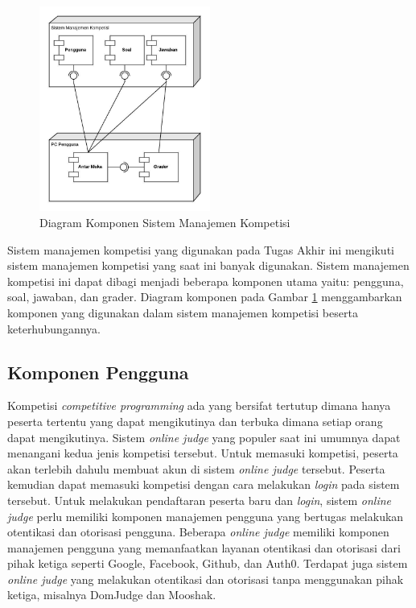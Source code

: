 \begin{figure}[ht!]
    \centering
    \includegraphics[width=0.5\textwidth]{images/oj-components}
    \caption{Diagram Komponen Sistem Manajemen Kompetisi}
    \label{fig:oj-components}
\end{figure}

\par Sistem manajemen kompetisi yang digunakan pada Tugas Akhir ini mengikuti sistem manajemen kompetisi yang saat ini banyak digunakan. Sistem manajemen kompetisi ini dapat dibagi menjadi beberapa komponen utama yaitu: pengguna, soal, jawaban, dan grader. Diagram komponen pada Gambar \ref{fig:oj-components} menggambarkan komponen yang digunakan dalam sistem manajemen kompetisi beserta keterhubungannya.

\subsection{Komponen Pengguna}

\par Kompetisi \textit{competitive programming} ada yang bersifat tertutup dimana hanya peserta tertentu yang dapat mengikutinya dan terbuka dimana setiap orang dapat mengikutinya. Sistem \textit{online judge} yang populer saat ini umumnya dapat menangani kedua jenis kompetisi tersebut. Untuk memasuki kompetisi, peserta akan terlebih dahulu membuat akun di sistem \textit{online judge} tersebut. Peserta kemudian dapat memasuki kompetisi dengan cara melakukan \textit{login} pada sistem tersebut. Untuk melakukan pendaftaran peserta baru dan \textit{login}, sistem \textit{online judge} perlu memiliki komponen manajemen pengguna yang bertugas melakukan otentikasi dan otorisasi pengguna. Beberapa \textit{online judge} memiliki komponen manajemen pengguna yang memanfaatkan layanan otentikasi dan otorisasi dari pihak ketiga seperti Google, Facebook, Github, dan Auth0. Terdapat juga sistem \textit{online judge} yang melakukan otentikasi dan otorisasi tanpa menggunakan pihak ketiga, misalnya DomJudge dan Mooshak.

